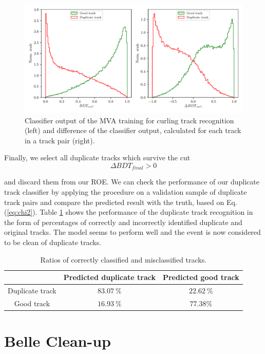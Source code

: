 \begin{figure}[!htb]
	\centering
	\captionsetup{width=0.8\linewidth}
	\includegraphics[width=\linewidth]{fig/ROECleanup_curl}
	\caption{Classifier output of the MVA training for curling track recognition (left) and difference of the classifier output, calculated for each track in a track pair (right).}
	\label{fig:ROE_curl}
\end{figure}

Finally, we select all duplicate tracks which survive the cut 
\begin{equation}
\Delta BDT_{final} > 0
\end{equation}

and discard them from our ROE. We can check the performance of our duplicate track classifier by applying the procedure on a validation sample of duplicate track pairs and compare the predicted result with the truth, based on Eq. (\ref{eq:chi2}). Table \ref{tab:rat} shows the performance of the duplicate track recognition in the form of percentages of correctly and incorrectly identified duplicate and original tracks. The model seems to perform well and the event is now considered to be clean of duplicate tracks.

\begin{table}[!htb]
	\centering
	\begin{tabular}{|c|c|c|}
		\hline
		& Predicted duplicate track & Predicted good track \\
		\hline 
		Duplicate track & $83.07~\%$  & $22.62~\%$  \\
		\hline
		Good track & $16.93~\%$ & $77.38\%$ \\
		\hline
	\end{tabular}
	\caption{Ratios of correctly classified and misclassified tracks.}
	\label{tab:rat}
\end{table}

\section{Belle Clean-up}

